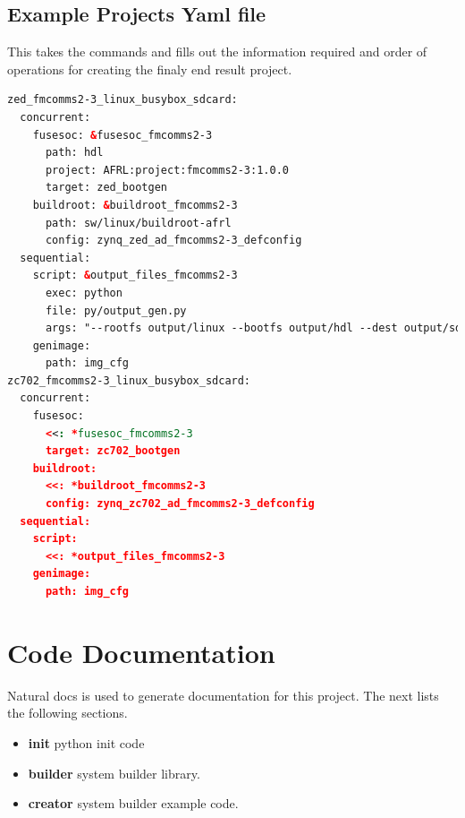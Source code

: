 \subsection{Example Projects Yaml file}
This takes the commands and fills out the information required and order of operations for creating the finaly end result project.
\begin{lstlisting}[language=XML]
zed_fmcomms2-3_linux_busybox_sdcard:
  concurrent:
    fusesoc: &fusesoc_fmcomms2-3
      path: hdl
      project: AFRL:project:fmcomms2-3:1.0.0
      target: zed_bootgen
    buildroot: &buildroot_fmcomms2-3
      path: sw/linux/buildroot-afrl
      config: zynq_zed_ad_fmcomms2-3_defconfig
  sequential:
    script: &output_files_fmcomms2-3
      exec: python
      file: py/output_gen.py
      args: "--rootfs output/linux --bootfs output/hdl --dest output/sdcard"
    genimage:
      path: img_cfg
zc702_fmcomms2-3_linux_busybox_sdcard:
  concurrent:
    fusesoc:
      <<: *fusesoc_fmcomms2-3
      target: zc702_bootgen
    buildroot:
      <<: *buildroot_fmcomms2-3
      config: zynq_zc702_ad_fmcomms2-3_defconfig
  sequential:
    script:
      <<: *output_files_fmcomms2-3
    genimage:
      path: img_cfg
\end{lstlisting}

\section{Code Documentation} \label{Code Documentation}

\par
Natural docs is used to generate documentation for this project. The next lists the following sections.

\begin{itemize}
\item \textbf{init} python init code\\
\item \textbf{builder} system builder library.\\
\item \textbf{creator} system builder example code.\\
\end{itemize}

